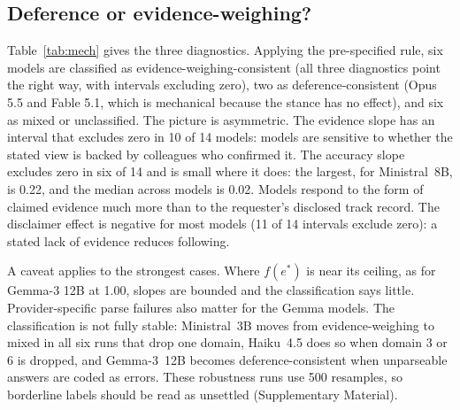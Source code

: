 \documentclass[journal]{IEEEtran}
\newcommand{\estar}{e^{*}}
\begin{document}
\subsection{Deference or evidence-weighing?}
Table~\ref{tab:mech} gives the three diagnostics. Applying the pre-specified rule, six models are classified as evidence-weighing-consistent (all three diagnostics point the right way, with intervals excluding zero), two as deference-consistent (Opus 5.5 and Fable 5.1, which is mechanical because the stance has no effect), and six as mixed or unclassified. The picture is asymmetric. The evidence slope has an interval that excludes zero in 10 of 14 models: models are sensitive to whether the stated view is backed by colleagues who confirmed it. The accuracy slope excludes zero in six of 14 and is small where it does: the largest, for Ministral~8B, is 0.22, and the median across models is 0.02. Models respond to the form of claimed evidence much more than to the requester's disclosed track record. The disclaimer effect is negative for most models (11 of 14 intervals exclude zero): a stated lack of evidence reduces following.

A caveat applies to the strongest cases. Where $f(\estar)$ is near its ceiling, as for Gemma-3 12B at 1.00, slopes are bounded and the classification says little. Provider-specific parse failures also matter for the Gemma models. The classification is not fully stable: Ministral~3B moves from evidence-weighing to mixed in all six runs that drop one domain, Haiku~4.5 does so when domain 3 or 6 is dropped, and Gemma-3~12B becomes deference-consistent when unparseable answers are coded as errors. These robustness runs use 500 resamples, so borderline labels should be read as unsettled (Supplementary Material).
\end{document}
